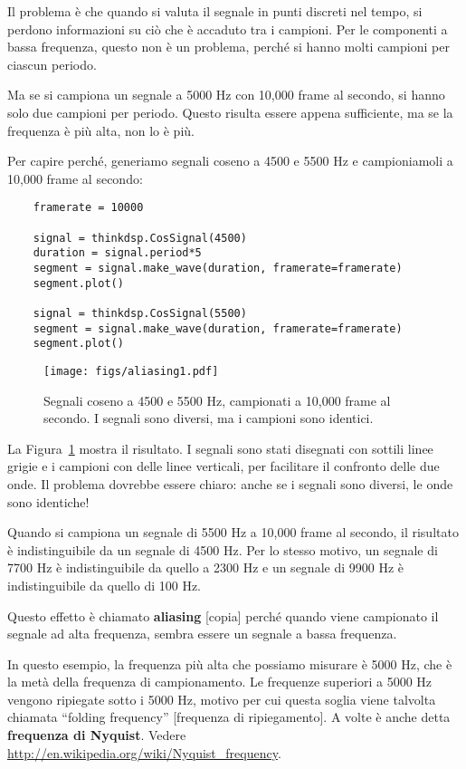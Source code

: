 \documentclass[12pt,a4paper]{book}
\begin{document}
Il problema è che quando si valuta il segnale in punti discreti nel tempo, si perdono informazioni su ciò che è accaduto tra i campioni. Per le componenti a bassa frequenza, questo non è un problema, perché si hanno molti campioni per ciascun periodo.

Ma se si campiona un segnale a 5000 Hz con 10,000 frame al secondo, si hanno solo due campioni per periodo. Questo risulta essere appena sufficiente, ma se la frequenza è più alta, non lo è più.

Per capire perché, generiamo segnali coseno a 4500 e 5500 Hz e campioniamoli a 10,000 frame al secondo:

\begin{verbatim} 
    framerate = 10000

    signal = thinkdsp.CosSignal(4500)
    duration = signal.period*5
    segment = signal.make_wave(duration, framerate=framerate)
    segment.plot()

    signal = thinkdsp.CosSignal(5500)
    segment = signal.make_wave(duration, framerate=framerate)
    segment.plot()
 \end{verbatim} 

\begin{figure} 

\centerline{\texttt{[image: figs/aliasing1.pdf]}} \caption{Segnali coseno a 4500 e 5500 Hz, campionati a 10,000 frame al secondo. I segnali sono diversi, ma i campioni sono identici.} \label{fig.aliasing1} \end{figure} 

La Figura~\ref{fig.aliasing1} mostra il risultato. I segnali sono stati disegnati con sottili linee grigie e i campioni con delle linee verticali, per facilitare il confronto delle due onde. Il problema dovrebbe essere chiaro: anche se i segnali sono diversi, le onde sono identiche!

Quando si campiona un segnale di 5500 Hz a 10,000 frame al secondo, il risultato è indistinguibile da un segnale di 4500 Hz. Per lo stesso motivo, un segnale di 7700 Hz è indistinguibile da quello a 2300 Hz e un segnale di 9900 Hz è indistinguibile da quello di 100 Hz.

Questo effetto è chiamato {\bf aliasing} [copia] perché quando viene campionato il segnale ad alta frequenza, sembra essere un segnale a bassa frequenza.

In questo esempio, la frequenza più alta che possiamo misurare è 5000 Hz, che è la metà della frequenza di campionamento. Le frequenze superiori a 5000 Hz vengono ripiegate sotto i 5000 Hz, motivo per cui questa soglia viene talvolta chiamata ``folding frequency'' [frequenza di ripiegamento]. A volte è anche detta {\bf frequenza di Nyquist}. Vedere \url{http://en.wikipedia.org/wiki/Nyquist_frequency}.
\end{document}
